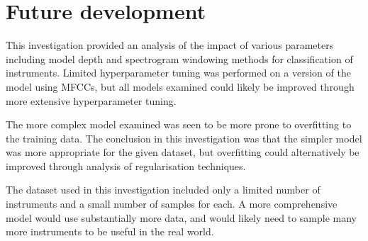 \documentclass[class=report,11pt,crop=false]{standalone}
\begin{document}
\ifstandalone
\tableofcontents
\fi
\section{Future development \label{ch:recommendations}}

This investigation provided an analysis of the impact of various parameters including model depth and spectrogram windowing methods for classification of instruments. Limited hyperparameter tuning was performed on a version of the model using MFCCs, but all models examined could likely be improved through more extensive hyperparameter tuning.

The more complex model examined was seen to be more prone to overfitting to the training data. The conclusion in this investigation was that the simpler model was more appropriate for the given dataset, but overfitting could alternatively be improved through analysis of regularisation techniques.

The dataset used in this investigation included only a limited number of instruments and a small number of samples for each. A more comprehensive model would use substantially more data, and would likely need to sample many more instruments to be useful in the real world.


\ifstandalone

\printnoidxglossary[type=\acronymtype,nonumberlist]
\fi
\end{document}

